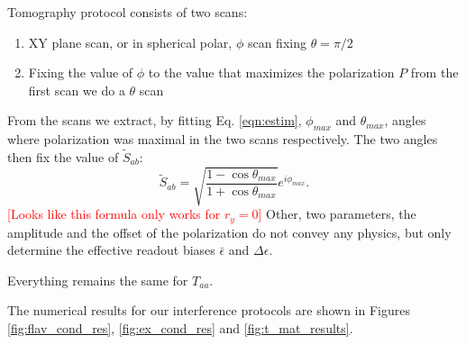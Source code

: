 \documentclass[two column]{article}
\newcommand{\caro}[1]{\textcolor{red}{[#1]}}
\begin{document}
Tomography protocol consists of two scans:\begin{enumerate}
    \item XY plane scan, or in spherical polar, $\phi$ scan fixing $\theta = \pi/2$
    \item Fixing the value of $\phi$ to the value that maximizes the polarization $P$ from the first scan we do a $\theta$ scan
\end{enumerate}
From the scans we extract, by fitting Eq. \ref{eqn:estim}, $\phi_{max}$ and $\theta_{max}$, angles where polarization was maximal in the two scans respectively. 
The two angles then fix the value of $\tilde{S}_{ab}$: $$\tilde{S}_{ab} = \sqrt{\frac{1-\cos{\theta_{max}}}{1+\cos{\theta_{max}}}}e^{i\phi_{max}}.$$
\caro{Looks like this formula only works for $r_y=0$}
Other, two parameters, the amplitude and the offset of the polarization do not convey any physics, but only determine the effective readout biases $\bar{\epsilon}$ and $\Delta\epsilon$.

Everything remains the same for $T_{aa}$.

The numerical results for our interference protocols are shown in Figures \ref{fig:flav_cond_res}, \ref{fig:ex_cond_res} and \ref{fig:t_mat_results}.
\end{document}
